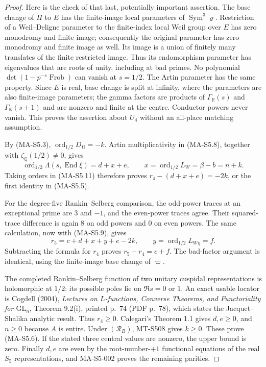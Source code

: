 \begin{proof}
Here is the check of that last, potentially important assertion.
The base change of $\Pi$ to $E$ has the finite-image local
parameters of $\operatorname{Sym}^3\varrho$. Restriction of a
Weil--Deligne parameter to the finite-index local Weil group
over $E$ has zero monodromy and finite image; consequently the
original parameter has zero monodromy and finite image as well.
Its image is a union of finitely many translates of the finite
restricted image. Thus its endomorphism parameter has eigenvalues
that are roots of unity, including at bad primes. No polynomial
$\det(1-p^{-s}\operatorname{Frob})$ can vanish at $s=1/2$.
The Artin parameter has the same property. Since $E$ is real,
base change is split at infinity, where the parameters are also
finite-image parameters; the gamma factors are products of
$\Gamma_{\mathbb R}(s)$ and $\Gamma_{\mathbb R}(s+1)$ and are
nonzero and finite at the centre. Conductor powers never vanish.
This proves the assertion about $U_4$ without an all-place
matching assumption.

By (MA-S5.3), $\operatorname{ord}_{1/2}D_\Omega=-k$.
Artin multiplicativity in (MA-S5.8), together with
$\zeta_{\mathbb Q}(1/2)\ne0$, gives
\[
 \operatorname{ord}_{1/2}\Lambda(s,\operatorname{End}\xi)=d+x+e,
 \qquad x=\operatorname{ord}_{1/2}L_W=\beta-b=n+k.
\]
Taking orders in (MA-S5.11) therefore proves
$r_4-(d+x+e)=-2k$, or the first identity in (MA-S5.5).

For the degree-five Rankin--Selberg comparison, the odd-power
traces at an exceptional prime are $3$ and $-1$, and the even-power
traces agree. Their squared-trace difference is again $8$ on odd
powers and $0$ on even powers. The same calculation, now with
(MA-S5.9), gives
\[
 r_5=c+d+x+y+e-2k,
 \qquad y=\operatorname{ord}_{1/2}L_{W\eta}=f.
\]
Subtracting the formula for $r_4$ proves $r_5-r_4=c+f$.
The bad-factor argument is identical, using the finite-image
base change of $\varpi$.

The completed Rankin--Selberg function of two unitary cuspidal
representations is holomorphic at $1/2$: its possible poles lie
on $\Re s=0$ or $1$. An exact usable locator is Cogdell (2004),
\emph{Lectures on $L$-functions, Converse Theorems, and Functoriality
for $\mathrm{GL}_n$}, Theorem 9.2(i), printed p.~74 (PDF p.~78),
which states the Jacquet--Shalika analytic result. Thus $r_4\ge0$.
Calegari's Theorem 1.1 gives $d,e\ge0$, and $n\ge0$ because
$A$ is entire. Under $(\mathcal R_B)$, MT-S508 gives $k\ge0$.
These prove (MA-S5.6). If the stated three central values are
nonzero, the upper bound is zero. Finally $d,e$ are even by the
root-number-$+1$ functional equations of the real $S_5$
representations, and MA-S5-002 proves the remaining parities.
\end{proof}

